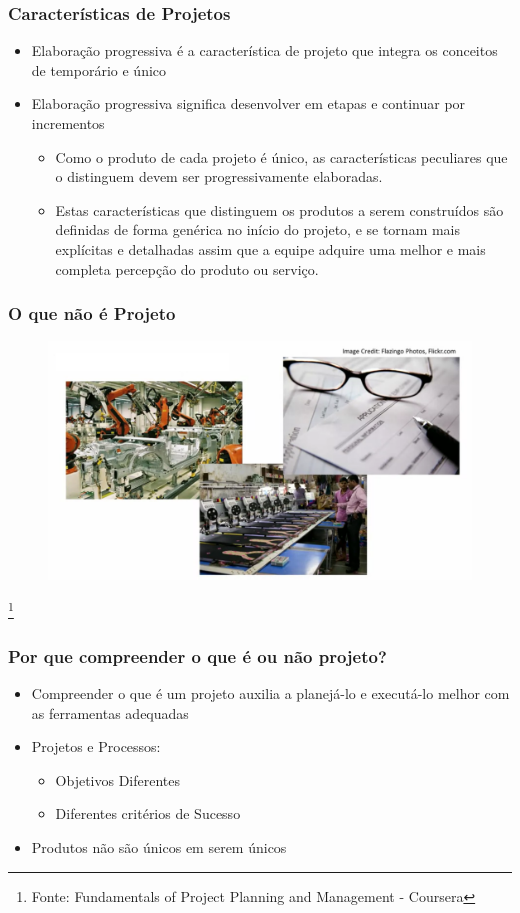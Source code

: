   
  \begin{frame}
   \frametitle{Características de Projetos}
   \begin{itemize}
    \item Elaboração progressiva é a característica de projeto que integra os conceitos de temporário e único
    \item Elaboração progressiva significa desenvolver em etapas e continuar por incrementos
    \begin{itemize}
     \item Como o produto de cada projeto é único, as características peculiares que o distinguem devem ser progressivamente elaboradas. 
     \item Estas características que distinguem os produtos a serem construídos são definidas de forma genérica no início do  projeto, e se tornam mais explícitas e detalhadas assim que a equipe adquire uma melhor e mais completa percepção do produto ou serviço.
    \end{itemize}
   \end{itemize}
  \end{frame}
  
\begin{frame}
 \frametitle{O que não é Projeto}
  \begin{figure}
  \centering
  \includegraphics[width = \textwidth]{figs/fig_proj4.png}
 \end{figure}
\footnote{Fonte: Fundamentals of Project Planning and Management - Coursera}
\end{frame}

\begin{frame}
 \frametitle{Por que compreender o que é ou não projeto?}
  \begin{itemize}
  \item Compreender o que é um projeto auxilia a planejá-lo e executá-lo melhor com as ferramentas adequadas
  \item Projetos e Processos:
  \begin{itemize}
   \item Objetivos Diferentes
   \item Diferentes critérios de Sucesso
  \end{itemize}
  \item Produtos não são únicos em serem únicos
 \end{itemize}
\end{frame}


